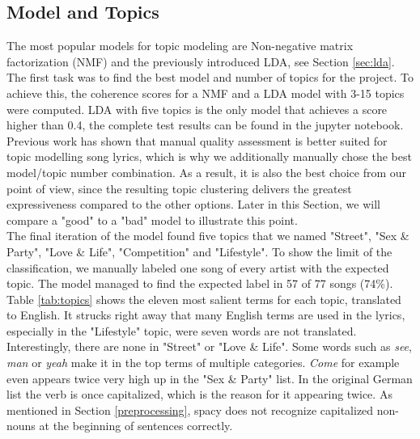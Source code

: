 \documentclass[conference]{IEEEtran}
\begin{document}
\subsection{Model and Topics}
The most popular models for topic modeling are Non-negative matrix factorization (NMF) and the previously introduced LDA, see Section \ref{sec:lda}. The first task was to find the best model and number of topics for the project. To achieve this, the coherence scores for a NMF and a LDA model with 3-15 topics were computed. LDA with five topics is the only model that achieves a score higher than 0.4, the complete test results can be found in the jupyter notebook. Previous work has shown \cite{sterckx} that manual quality assessment is better suited for topic modelling song lyrics, which is why we additionally manually chose the best model/topic number combination. As a result, it is also the best choice from our point of view, since the resulting topic clustering delivers the greatest expressiveness compared to the other options. Later in this Section, we will compare a "good" to a "bad" model to illustrate this point.\\
The final iteration of the model found five topics that we named "Street", "Sex \& Party", "Love \& Life", "Competition" and "Lifestyle". To show the limit of the classification, we manually labeled one song of every artist with the expected topic. The model managed to find the expected label in 57 of 77 songs (74\%). Table \ref{tab:topics} shows the eleven most salient terms for each topic, translated to English. It strucks right away that many English terms are used in the lyrics, especially in the "Lifestyle" topic, were seven words are not translated. Interestingly, there are none in "Street" or "Love \& Life". Some words such as \textit{see}, \textit{man} or \textit{yeah} make it in the top terms of multiple categories. \textit{Come} for example even appears twice very high up in the "Sex \& Party" list. In the original German list the verb is once capitalized, which is the reason for it appearing twice. As mentioned in Section \ref{preprocessing}, spacy does not recognize capitalized non-nouns at the beginning of sentences correctly.
\end{document}
